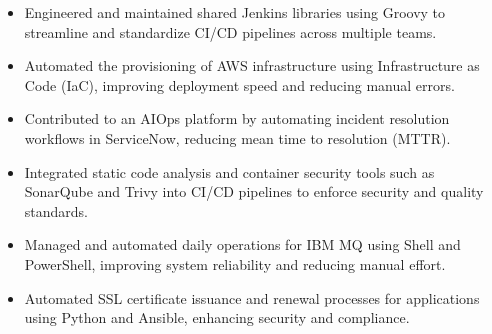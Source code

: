 \documentclass[10pt,a4paper,ragged2e,withhyper]{altacv}
\begin{document}
\begin{paracol}{2}
\begin{itemize}
\item Engineered and maintained shared Jenkins libraries using Groovy to streamline and standardize CI/CD pipelines across multiple teams.
\item Automated the provisioning of AWS infrastructure using Infrastructure as Code (IaC), improving deployment speed and reducing manual errors.
\item Contributed to an AIOps platform by automating incident resolution workflows in ServiceNow, reducing mean time to resolution (MTTR).
\item Integrated static code analysis and container security tools such as SonarQube and Trivy into CI/CD pipelines to enforce security and quality standards.
\item Managed and automated daily operations for IBM MQ using Shell and PowerShell, improving system reliability and reducing manual effort.
\item Automated SSL certificate issuance and renewal processes for applications using Python and Ansible, enhancing security and compliance.


\end{itemize}

\medskip







\end{paracol}
\end{document}
